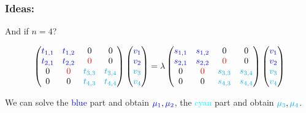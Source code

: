 \documentclass{beamer}
\theoremstyle{definition} \newtheorem{de}{Def}
\theoremstyle{remark} \newtheorem{os}[de]{Oss}
\theoremstyle{plain} \newtheorem{te}[de]{Teo}
\theoremstyle{plain} \newtheorem{co}[de]{Cor}
\theoremstyle{plain} \newtheorem{pr}[de]{Prop}
\theoremstyle{plain} \newtheorem{lem}[de]{Lemm}
\theoremstyle{remark} \newtheorem{rem}[de]{Remark}
\begin{document}
\begin{frame}
  \frametitle{Ideas:}

  And if $n=4$?
  

  \begin{equation*}
    \begin{pmatrix}
      \textcolor{blue}{t_{1,1}} & \textcolor{blue}{t_{1,2}} & 0 & 0\\
      \textcolor{blue}{t_{2,1}} & \textcolor{blue}{t_{2,2}} & \textcolor{red}{0} & 0\\
      0 & \textcolor{red}{0} & \textcolor{cyan}{t_{3,3}} & \textcolor{cyan}{t_{3,4}}\\
      0 & 0 & \textcolor{cyan}{t_{4,3}} & \textcolor{cyan}{t_{4,4}}
    \end{pmatrix} \begin{pmatrix} 
      \textcolor{blue}{v_1} \\ 
      \textcolor{blue}{v_2} \\
      \textcolor{cyan}{v_3} \\
      \textcolor{cyan}{v_4}
    \end{pmatrix} = \lambda \begin{pmatrix}
      \textcolor{blue}{s_{1,1}} & \textcolor{blue}{s_{1,2}} & 0 & 0\\
      \textcolor{blue}{s_{2,1}} & \textcolor{blue}{s_{2,2}} & \textcolor{red}{0} & 0\\
      0 & \textcolor{red}{0} & \textcolor{cyan}{s_{3,3}} & \textcolor{cyan}{s_{3,4}}\\
      0 & 0 & \textcolor{cyan}{s_{4,3}} & \textcolor{cyan}{s_{4,4}}
    \end{pmatrix} \begin{pmatrix}
      \textcolor{blue}{v_1} \\ 
      \textcolor{blue}{v_2} \\
      \textcolor{cyan}{v_3} \\
      \textcolor{cyan}{v_4}
    \end{pmatrix}
  \end{equation*}


\pause


We can solve the \textcolor{blue}{blue} part and obtain $\textcolor{blue}{\mu_{1}},\textcolor{blue}{\mu_{2}}$, the \textcolor{cyan}{cyan} part and obtain $\textcolor{cyan}{\mu_{3}},\textcolor{cyan}{\mu_{4}}$.

\end{frame}
\end{document}
